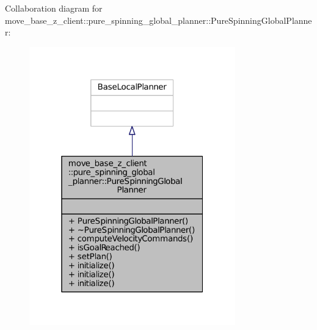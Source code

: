 Collaboration diagram for move\+\_\+base\+\_\+z\+\_\+client\+:\+:pure\+\_\+spinning\+\_\+global\+\_\+planner\+:\+:Pure\+Spinning\+Global\+Planner\+:
\nopagebreak
\begin{figure}[H]
\begin{center}
\leavevmode
\includegraphics[width=253pt]{classmove__base__z__client_1_1pure__spinning__global__planner_1_1PureSpinningGlobalPlanner__coll__graph}
\end{center}
\end{figure}
